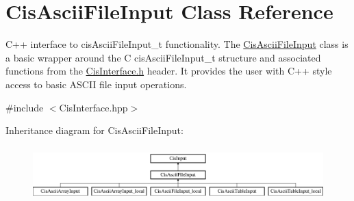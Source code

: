 \hypertarget{classCisAsciiFileInput}{}\section{Cis\+Ascii\+File\+Input Class Reference}
\label{classCisAsciiFileInput}


C++ interface to cis\+Ascii\+File\+Input\+\_\+t functionality. The \mbox{\hyperlink{classCisAsciiFileInput}{Cis\+Ascii\+File\+Input}} class is a basic wrapper around the C cis\+Ascii\+File\+Input\+\_\+t structure and associated functions from the \mbox{\hyperlink{CisInterface_8h_source}{Cis\+Interface.\+h}} header. It provides the user with C++ style access to basic A\+S\+C\+II file input operations.  




{\ttfamily \#include $<$Cis\+Interface.\+hpp$>$}

Inheritance diagram for Cis\+Ascii\+File\+Input\+:\begin{figure}[H]
\begin{center}
\leavevmode
\includegraphics[height=2.100000cm]{classCisAsciiFileInput}
\end{center}
\end{figure}
